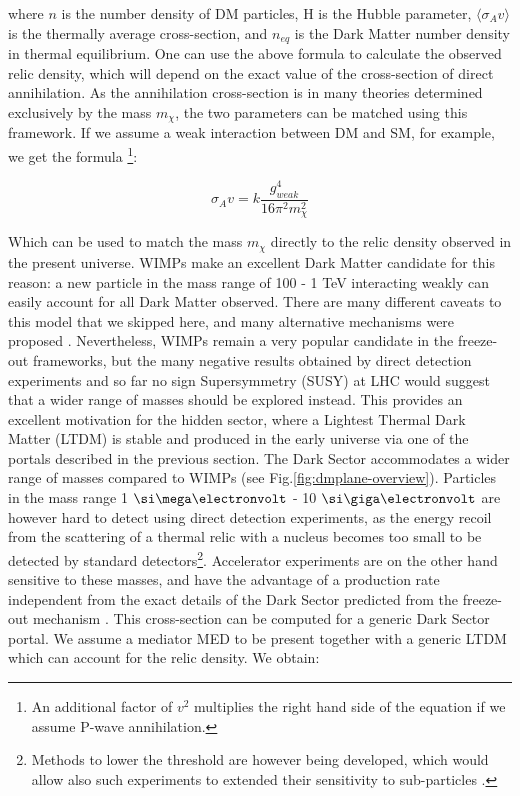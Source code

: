   where $n$ is the number density of DM particles, H is the Hubble parameter,  $\langle \sigma_A v \rangle$ is the thermally average cross-section, and $n_{eq}$ is the Dark Matter number density in thermal equilibrium. One can use the above formula to calculate the observed relic density, which will depend on the exact value of the cross-section of direct annihilation. As the annihilation cross-section is in many theories determined exclusively by the mass $m_{\chi}$, the two parameters can be matched using this framework. If we assume a weak interaction between DM and SM, for example, we get the formula \cite{Feng:2010gw}\footnote{An additional factor of $v^2$ multiplies the right hand side of the equation if we assume P-wave annihilation.}:

  \begin{equation}
    \label{eq:dm-fo-sigma}
    \sigma_A v = k \frac{g^4_{weak}}{16 \pi^2 m^2_{\chi}}
  \end{equation}

  Which can be used to match the mass $m_{\chi}$ directly to the relic density observed in the present universe. WIMPs make an excellent Dark Matter candidate for this reason: a new particle in the mass range of 100 \gev - 1 \si{\tera\electronvolt} interacting weakly can easily account for all Dark Matter observed. There are many different caveats to this model that we skipped here, and many alternative mechanisms were proposed \cite{Hall:2009bx,Feng:2010gw,Marsh:2015xka,Griest:1990kh,Arcadi:2017kky}. Nevertheless, WIMPs remain a very popular candidate in the freeze-out frameworks, but the many negative results obtained by direct detection experiments and so far no sign Supersymmetry (SUSY) at LHC would suggest that a wider range of masses should be explored instead. This provides an excellent motivation for the hidden sector, where a Lightest Thermal Dark Matter (LTDM) is stable and produced in the early universe via one of the portals described in the previous section. The Dark Sector accommodates a wider range of masses compared to WIMPs (see Fig.\ref{fig:dmplane-overview}). Particles in the mass range 1 $\mev$ - 10 $\gev$ are however hard to detect using direct detection experiments, as the energy recoil from the scattering of a thermal relic with a nucleus becomes too small to be detected by standard detectors\footnote{Methods to lower the threshold are however being developed, which would allow also such experiments to extended their sensitivity to sub-\gev particles \cite{Baracchini:2020nut}.}. Accelerator experiments are on the other hand sensitive to these masses, and have the advantage of a production rate independent from the exact details of the Dark Sector predicted from the freeze-out mechanism \cite{battaglieri2017cosmic}. This cross-section can be computed for a generic Dark Sector portal. We assume a mediator MED to be present together with a generic LTDM which can account for the relic density. We obtain:

